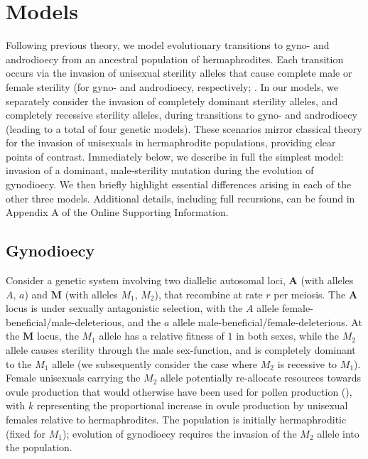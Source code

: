 \documentclass{article}
\begin{document}
\section*{Models} \label{sec:Models}

Following previous theory, we model evolutionary transitions to gyno- and androdioecy from an ancestral population of hermaphrodites. Each transition occurs via the invasion of unisexual sterility alleles that cause complete male or female sterility (for gyno- and androdioecy, respectively; \citep{Charlesworth1978a}. In our models, we separately consider the invasion of completely dominant sterility alleles, and completely recessive sterility alleles, during transitions to gyno- and androdioecy (leading to a total of four genetic models). These scenarios mirror classical theory for the invasion of unisexuals in hermaphrodite populations, providing clear points of contrast. Immediately below, we describe in full the simplest model: invasion of a dominant, male-sterility mutation during the evolution of gynodioecy. We then briefly highlight essential differences arising in each of the other three models. Additional details, including full recursions, can be found in Appendix A of the Online Supporting Information.

\subsection*{Gynodioecy}

Consider a genetic system involving two diallelic autosomal loci, $\mathbf{A}$ (with alleles $A$, $a$) and $\mathbf{M}$ (with alleles $M_1$, $M_2$), that recombine at rate $r$ per meiosis. The $\mathbf{A}$ locus is under sexually antagonistic selection, with the $A$ allele female-beneficial/male-deleterious, and the $a$ allele male-beneficial/female-deleterious. At the $\mathbf{M}$ locus, the $M_1$ allele has a relative fitness of $1$ in both sexes, while the $M_2$ allele causes sterility through the male sex-function, and is completely dominant to the $M_1$ allele (we subsequently consider the case where $M_2$ is recessive to $M_1$). Female unisexuals carrying the $M_2$ allele potentially re-allocate resources towards ovule production that would otherwise have been used for pollen production (\citealt{Lloyd1975,Lloyd1976,Charlesworth1978a}), with $k$ representing the proportional increase in ovule production by unisexual females relative to hermaphrodites. The population is initially hermaphroditic (fixed for $M_1$); evolution of gynodioecy requires the invasion of the $M_2$ allele into the population.
\end{document}
